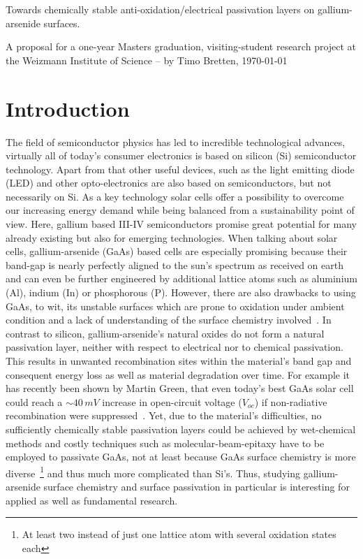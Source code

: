 \documentclass[a4paper]{article}
\begin{document}
\begin{center}
\begin{Huge}
Towards chemically stable anti-oxidation/electrical passivation layers on gallium-arsenide surfaces. \\[1cm]
\end{Huge}
\hline
\end{center}
\begin{flushright}
A proposal for a one-year Masters graduation, visiting-student research project at\newline
the Weizmann Institute of Science\newline
-- by Timo Bretten, \today
\end{flushright}
\section*{Introduction}
The field of semiconductor physics has led to incredible technological advances, virtually all of today's consumer electronics is based on silicon (Si) semiconductor technology. Apart from that other useful devices, such as the light emitting diode (LED) and other opto-electronics are also based on semiconductors, but not necessarily on Si. As a key technology solar cells offer a possibility to overcome our increasing energy demand while being balanced from a sustainability point of view. Here, gallium based III-IV semiconductors promise great potential for many already existing but also for emerging technologies. When talking about solar cells, gallium-arsenide (GaAs) based cells are especially promising because their band-gap is nearly perfectly aligned to the sun's spectrum as received on earth and can even be further engineered by additional lattice atoms such as aluminium (Al), indium (In) or phosphorous (P). However, there are also drawbacks to using GaAs, to wit, its unstable surfaces which are prone to oxidation under ambient condition and a lack of understanding of the surface chemistry involved~\cite{review}. In contrast to silicon, gallium-arsenide's natural oxides do not form a natural passivation layer, neither with respect to electrical nor to chemical passivation. This results in unwanted recombination sites within the material's band gap and consequent energy loss as well as material degradation over time. For example it has recently been shown by Martin Green, that even today's best GaAs solar cell could reach a $\sim 40\, mV$ increase in open-circuit voltage ($V_{oc}$) if non-radiative recombination were suppressed~\cite{green}. Yet, due to the material's difficulties, no sufficiently chemically stable passivation layers could be achieved by wet-chemical methods and costly techniques such as molecular-beam-epitaxy have to be employed to passivate GaAs, not at least because GaAs surface chemistry is more diverse~\footnote{At least two instead of just one lattice atom with several oxidation states each} and thus much more complicated than Si's. Thus, studying gallium-arsenide surface chemistry and surface passivation in particular is interesting for applied as well as fundamental research.
\end{document}
